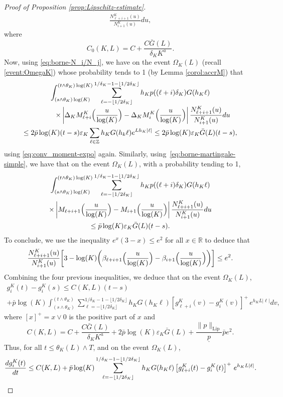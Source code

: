 \documentclass[JEP,XML,SOM,Unicode,published]{cedram}
\theoremstyle{plain}
\theoremstyle{remark}
\newcommand\Z{\mathbb{Z}}
\begin{document}
\begin{proof}[Proof of Proposition \ref{prop:Lipschitz-estimate}]
{\begin{align*}
\frac{N^K_{\ell+i+1}(u)}{N^K_{i+1}(u)}du,
\end{align*}
where \[C_0(K,L) = C+\frac{C\bar G(L)}{\delta_K K^a}.\] Now, using \eqref{eq:borne-N_i/N_j}, we have on the event $\Omega_K(L)$ (recall \eqref{event:OmegaK}) whose probability tends to 1 (by Lemma \ref{corol:accrM}) that
\begin{multline*}
\int_{(s\wedge\theta_K)\log(K)}^{(t\wedge\theta_K)\log(K)} \sum_{\ell=-\lfloor 1/2\delta_K\rfloor}^{1/\delta_K-1-\lfloor 1/2\delta_K\rfloor}
h_{K} p((\ell+i)\delta_K)G(h_{K}\ell)\\[-3pt]
\shoveright{\times\left|\Delta_KM^K_{\ell+i}\Bigl(\frac{u}{\log(K)}\Bigr)-\Delta_KM^K_{i}\Bigl(\frac{u}{\log(K)}\Bigr)\right|
\frac{N^K_{\ell+i+1}(u)}{N^K_{i+1}(u)}du} \\
\leq 2\bar p \log(K) (t-s)\varepsilon_K\sum_{\ell\in\Z} h_K G(h_k\ell)e^{L h_K|\ell|}\leq 2\bar{p}\log(K) \varepsilon_K \bar G(L)(t-s),
\end{multline*}
using \eqref{eq:conv_moment-expo} again.
Similarly, using~\eqref{eq:borne-martingale-simple}, we have that on the event $\Omega_K(L)$, with a probability tending to 1,
\begin{multline*}
\int_{(s\wedge\theta_K)\log(K)}^{(t\wedge\theta_K)\log(K)} \sum_{\ell=-\lfloor 1/2\delta_K\rfloor}^{1/\delta_K-1-\lfloor 1/2\delta_K\rfloor}
h_{K} p((\ell+i)\delta_K)G(h_{K}\ell)\\
\times \left|M_{\ell+i+1}\Bigl(\frac{u}{\log(K)}\Bigr)-M_{i+1}\Bigl(\frac{u}{\log(K)}\Bigr)\right|
\frac{N^K_{\ell+i+1}(u)}{N^K_{i+1}(u)}du\\
\leq \bar{p}\log(K) \varepsilon_K \bar G(L)(t-s).
\end{multline*}
To conclude, we use the inequality {$e^x(3-x)\leq e^2$} for all $x\in\mathbb{R}$ to deduce that
\[
\frac{N^K_{\ell+i+1}(u)}{N^K_{i+1}(u)}\biggl[{3}-\log(K)\biggl(\beta_{\ell+i+1}\Bigl(\frac{u}{\log(K)}\Bigr)-\beta_{i+1}\Bigl(\frac{u}{\log(K)}\Bigr)\biggr)\biggr]\leq {e^2}.
\]
Combining the four previous inequalities, we deduce that on the event $\Omega_K(L)$,
\begin{multline*}g^K_{i}(t)-g^K_{i}(s) \leq C(K,L)(t-s)\\
+
\bar p \log(K) \int_{(s\wedge\theta_K)}^{(t\wedge\theta_K)} \sum_{\ell=-\lfloor 1/2\delta_K\rfloor}^{1/\delta_K-1-\lfloor 1/2\delta_K\rfloor}
h_{K} G(h_{K}\ell) \left[g^K_{\ell+i}(v) - g^K_{i}(v)\right]^+ \, e^{h_{K}L|\ell|}dv,\end{multline*}
where $[x]^+=x\vee 0$ is the positive part of $x$ and
\[
C(K,L)=C+\frac{C\bar G(L)}{\delta_K K^
a} +2\bar{p}\log(K) \varepsilon_K \bar G(L)+ \frac{\|p\|_{\text{Lip}}}{\underline{p}}\bar{p}e^2.
\]
Thus, for all $t\leq\theta_K(L)\wedge T$, and on the event $\Omega_K(L)$,
\[
{d g^K_{i}(t)\over dt} \le C(K,L)
+ \bar p \log(K)\sum_{\ell=-\lfloor 1/2\delta_K\rfloor}^{1/\delta_K-1-\lfloor 1/2\delta_K\rfloor}
h_{K} G(h_{K}\ell) \left[g^K_{\ell+i}(t) - g^K_{i}(t)\right]^+ \, e^{h_{K}L|\ell|}.
\]

}
\end{proof}
\end{document}
